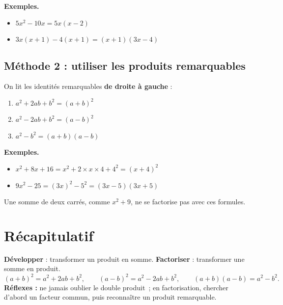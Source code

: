 \documentclass[../main.tex]{subfiles}
\begin{document}
\textbf{Exemples.}
\begin{itemize}
  \item $5x^2 - 10x = 5x(x - 2)$
  \item $3x(x+1) - 4(x+1) = (x+1)(3x - 4)$
\end{itemize}

\subsection{Méthode 2 : utiliser les produits remarquables}

On lit les identités remarquables \textbf{de droite à gauche} :
\begin{enumerate}
  \item $a^2 + 2ab + b^2 = (a + b)^2$
  \item $a^2 - 2ab + b^2 = (a - b)^2$
  \item $a^2 - b^2 = (a + b)(a - b)$
\end{enumerate}

\textbf{Exemples.}
\begin{itemize}
  \item $x^2 + 8x + 16 = x^2 + 2 \times x \times 4 + 4^2 = (x + 4)^2$
  \item $9x^2 - 25 = (3x)^2 - 5^2 = (3x - 5)(3x + 5)$
\end{itemize}

\begin{attention}
Une somme de deux carrés, comme $x^2 + 9$, ne se factorise pas avec ces formules.
\end{attention}

\section{Récapitulatif}

\begin{tcolorbox}[colback=gray!6,colframe=gray!60!black,title={\bfseries À retenir}]
\textbf{Développer} : transformer un produit en somme. \quad \textbf{Factoriser} : transformer une somme en produit.
\[
(a+b)^2 = a^2 + 2ab + b^2, \qquad (a-b)^2 = a^2 - 2ab + b^2, \qquad (a+b)(a-b) = a^2 - b^2.
\]
\textbf{Réflexes :} ne jamais oublier le double produit~; en factorisation, chercher d'abord un facteur commun, puis reconnaître un produit remarquable.
\end{tcolorbox}

\newpage
\end{document}
